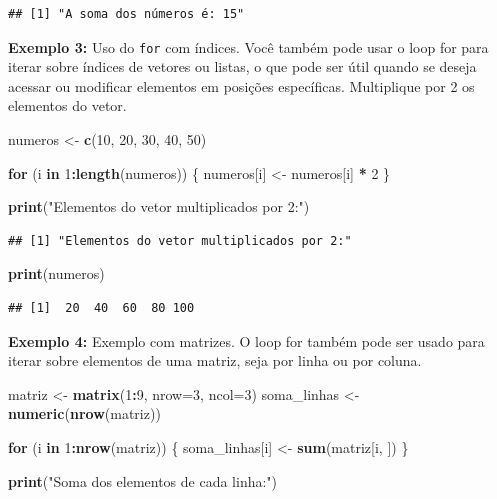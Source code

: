 \documentclass[
]{book}
\newenvironment{Shaded}{\begin{snugshade}}{\end{snugshade}}
\newcommand{\AttributeTok}[1]{\textcolor[rgb]{0.13,0.29,0.53}{#1}}
\newcommand{\ControlFlowTok}[1]{\textcolor[rgb]{0.13,0.29,0.53}{\textbf{#1}}}
\newcommand{\DecValTok}[1]{\textcolor[rgb]{0.00,0.00,0.81}{#1}}
\newcommand{\FunctionTok}[1]{\textcolor[rgb]{0.13,0.29,0.53}{\textbf{#1}}}
\newcommand{\NormalTok}[1]{#1}
\newcommand{\OtherTok}[1]{\textcolor[rgb]{0.56,0.35,0.01}{#1}}
\newcommand{\SpecialCharTok}[1]{\textcolor[rgb]{0.81,0.36,0.00}{\textbf{#1}}}
\newcommand{\StringTok}[1]{\textcolor[rgb]{0.31,0.60,0.02}{#1}}
\begin{document}
\begin{verbatim}
## [1] "A soma dos números é: 15"
\end{verbatim}

\textbf{Exemplo 3:} Uso do \texttt{for} com índices. Você também pode usar o loop for para iterar sobre índices de vetores ou listas, o que pode ser útil quando se deseja acessar ou modificar elementos em posições específicas. Multiplique por 2 os elementos do vetor.

\begin{Shaded}
\begin{Highlighting}[]
\NormalTok{numeros }\OtherTok{\textless{}{-}} \FunctionTok{c}\NormalTok{(}\DecValTok{10}\NormalTok{, }\DecValTok{20}\NormalTok{, }\DecValTok{30}\NormalTok{, }\DecValTok{40}\NormalTok{, }\DecValTok{50}\NormalTok{)}

\ControlFlowTok{for}\NormalTok{ (i }\ControlFlowTok{in} \DecValTok{1}\SpecialCharTok{:}\FunctionTok{length}\NormalTok{(numeros)) \{}
\NormalTok{  numeros[i] }\OtherTok{\textless{}{-}}\NormalTok{ numeros[i] }\SpecialCharTok{*} \DecValTok{2}
\NormalTok{\}}

\FunctionTok{print}\NormalTok{(}\StringTok{"Elementos do vetor multiplicados por 2:"}\NormalTok{)}
\end{Highlighting}
\end{Shaded}

\begin{verbatim}
## [1] "Elementos do vetor multiplicados por 2:"
\end{verbatim}

\begin{Shaded}
\begin{Highlighting}[]
\FunctionTok{print}\NormalTok{(numeros)}
\end{Highlighting}
\end{Shaded}

\begin{verbatim}
## [1]  20  40  60  80 100
\end{verbatim}

\textbf{Exemplo 4:} Exemplo com matrizes. O loop for também pode ser usado para iterar sobre elementos de uma matriz, seja por linha ou por coluna.

\begin{Shaded}
\begin{Highlighting}[]
\NormalTok{matriz }\OtherTok{\textless{}{-}} \FunctionTok{matrix}\NormalTok{(}\DecValTok{1}\SpecialCharTok{:}\DecValTok{9}\NormalTok{, }\AttributeTok{nrow=}\DecValTok{3}\NormalTok{, }\AttributeTok{ncol=}\DecValTok{3}\NormalTok{)}
\NormalTok{soma\_linhas }\OtherTok{\textless{}{-}} \FunctionTok{numeric}\NormalTok{(}\FunctionTok{nrow}\NormalTok{(matriz))}

\ControlFlowTok{for}\NormalTok{ (i }\ControlFlowTok{in} \DecValTok{1}\SpecialCharTok{:}\FunctionTok{nrow}\NormalTok{(matriz)) \{}
\NormalTok{  soma\_linhas[i] }\OtherTok{\textless{}{-}} \FunctionTok{sum}\NormalTok{(matriz[i, ])}
\NormalTok{\}}

\FunctionTok{print}\NormalTok{(}\StringTok{"Soma dos elementos de cada linha:"}\NormalTok{)}
\end{Highlighting}
\end{Shaded}
\end{document}
